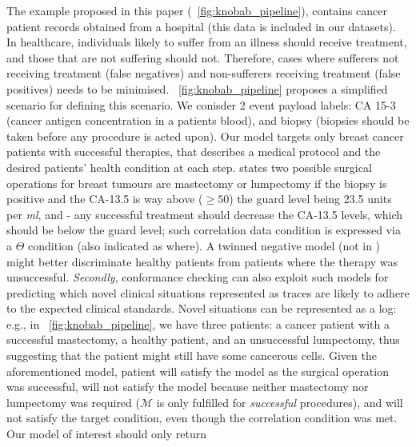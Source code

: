 {The example proposed in this paper (\figurename~\ref{fig:knobab_pipeline}), contains cancer patient records obtained from a hospital (this data is included in our datasets). In healthcare, individuals likely to suffer from an illness should receive treatment, and those that are not suffering should not. Therefore, cases where sufferers not receiving treatment (false negatives) and non-sufferers receiving treatment (false positives) needs to be minimised. \figurename~\ref{fig:knobab_pipeline} proposes a simplified scenario for defining this scenario. We conisder 2 event payload labels: \textsf{CA 15-3} (cancer antigen concentration in a patients blood), and \textsf{biopsy} (biopsies should be taken before any procedure is acted upon). Our model targets only breast cancer patients with successful therapies, that describes a medical protocol and the desired patients' health condition at each step. } %
  {states} two possible surgical operations for  breast tumours  are  mastectomy or lumpectomy if the biopsy is positive and the CA-13.5 is way above ($\geq 50$) the guard level being 23.5 units per \textit{ml},  and   -  any successful treatment should decrease the CA-13.5 levels, which should be below the guard level; such correlation data condition is expressed via a $\Theta$ condition (also indicated as  \textsf{where}). A twinned negative model (not in \figurename) might better discriminate healthy patients from patients where the therapy was unsuccessful.
\textit{Secondly}, conformance checking can also exploit such models
for predicting which novel clinical situations represented as %
traces are likely to adhere to the expected clinical standards. Novel situations can be represented as a log: e.g., in \figurename~\ref{fig:knobab_pipeline}, we have three patients:  a cancer patient with a successful mastectomy,  a healthy patient, and  an unsuccessful lumpectomy, thus suggesting that the patient might still have some cancerous cells. Given the aforementioned model, patient  will satisfy the model as the surgical operation was successful,  will not satisfy the model because neither mastectomy nor lumpectomy was required {($\mathcal{M}$ is only fulfilled for \textit{successful} procedures)}, and  will not satisfy the  target condition, even though the correlation condition was met. Our model of interest should only return %
